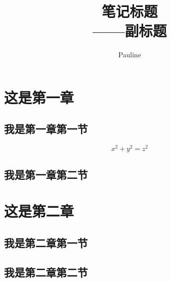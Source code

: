 \documentclass[12pt,a4paper,openany,fontset=none]{ctexbook}
\title{{\Huge{\textbf{笔记标题}}}
 \\ ——副标题
 }
\author{Pauline}
\date{}
\begin{document}
    \maketitle %

     \newpage
     \setcounter{page}{1}
     \tableofcontents
     \newpage
     \setcounter{page}{1}


    \pagestyle{heading}
    \chapter{这是第一章}
    \section{我是第一章第一节}
    $$ x^2 + y^2 = z^2 $$
    \section{我是第一章第二节}
    \zhlipsum
    \chapter{这是第二章}
    \section{我是第二章第一节}
    \zhlipsum
    \section{我是第二章第二节}
    \zhlipsum
\end{document}
